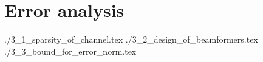 \chapter {Error analysis}

 {./3_1_sparsity_of_channel.tex}
 {./3_2_design_of_beamformers.tex}
 {./3_3_bound_for_error_norm.tex}
